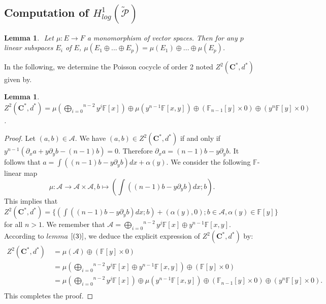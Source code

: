 \documentclass[a4paper, 12pt,oneside,reqno]{amsart}
\newtheorem{lemma}[theorem]{Lemma}
\theoremstyle{definition}
\begin{document}
             \subsection{Computation of $H_{log}^{1}(\tilde{\mathcal{P}})$}
             \begin{lemma} $\label{(3)}$
             Let $\mu: E\longrightarrow F $ a monomorphism of vector spaces. Then for any $p$ linear  subspaces $E_{i}$ of $E$,
          $\mu(E_{1}\oplus...\oplus E_{p})= \mu (E_{1})\oplus...\oplus\mu ( E_{p})$.
             \end{lemma}
          In the following, we determine the Poisson cocycle of order 2 noted $Z^{2}(\textbf{C}^{*},d^{*}) $ given  by.
             \begin{lemma}
              $Z^{2}(\textbf{C}^{*},d^{*}) = \mu (\overset{n-2}{\underset{i=0}{\bigoplus}}y^{j} \mathbb{F}[x] )\oplus \mu(y^{n-1} \mathbb{F}[x,y] )\oplus(\mathbb{F}_{n-1}[y]\times 0 )\oplus(y^{n} \mathbb{F}[y]\times 0 )$.
             \end{lemma}            
            \begin{proof}
            Let $(a,b)\in \mathcal{A}$. We have $(a,b)\in Z^{2}(\textbf{C}^{*},d^{*})$ if and only if $y^{n-1}\left(\partial_{x}a + y\partial_{y}b -(n-1)b\right)=0$. Therefore $\partial_{x}a = (n-1)b - y\partial_{y}b$. It follows that $ a=\int \left((n-1)b - y\partial_{y}b\right)dx + \alpha(y)$. We consider the following   $\mathbb{F}$-linear map
            \begin{equation}
            \mu : \mathcal{A} \longrightarrow \mathcal{A}\times \mathcal{A}, b\mapsto \left(\int ((n-1)b - y\partial_{y}b)dx; b\right).
            \end{equation}
            This implies that $ Z^{2}(\textbf{C}^{*},d^{*})= \{ \left(\int ((n-1)b - y\partial_{y}b)dx; b\right) + (\alpha(y),0); b\in \mathcal{A}, \alpha(y)\in \mathbb{F}[y] \}$ for all $n>1$.
           We remember that $\mathcal{A} =  \overset{n-2}{\underset{i=0}{\bigoplus}}y^{j} \mathbb{F}[x] \oplus y^{n-1} \mathbb{F}[x,y]$.
          According to $lemma$ $\ref{(3)}$, we deduce the explicit expression of  $Z^{2}(\textbf{C}^{*},d^{*})$ by:
            \begin{align*}
             Z^{2}(\textbf{C}^{*},d^{*}) &\ = \mu (\mathcal{A} )\oplus ( \mathbb{F}[y]\times 0)\\
             &\ = \mu \left(\overset{n-2}{\underset{i=0}{\bigoplus}}y^{j} \mathbb{F}[x] \oplus y^{n-1} \mathbb{F}[x,y] \right)\oplus ( \mathbb{F}[y]\times 0)\\
             &\ = \mu \left(\overset{n-2}{\underset{i=0}{\bigoplus}}y^{j} \mathbb{F}[x] \right)\oplus \mu\left(y^{n-1} \mathbb{F}[x,y] \right)\oplus(\mathbb{F}_{n-1}[y]\times 0 )\oplus(y^{n} \mathbb{F}[y]\times 0 ).\\
             \end{align*}
    This completes the proof.
            \end{proof}
\end{document}
